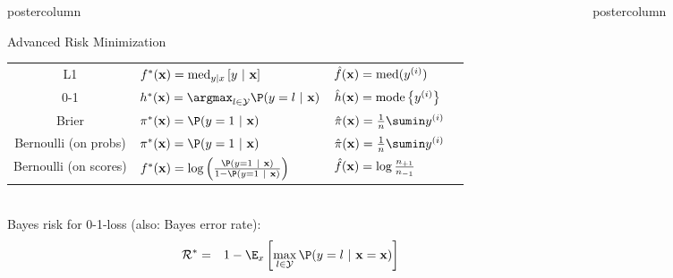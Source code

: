 \documentclass{beamer}
\newlength{\columnheight} %
\begin{document}
\begin{frame}[fragile]{}
\begin{columns}
\begin{column}{.31\textwidth}
\begin{beamercolorbox}[center]{postercolumn}
\begin{minipage}{.98\textwidth}
{\begin{myblock}{Advanced Risk Minimization}
{{\begin{table}[]
\begin{tabular}{c|lll}
												L1 & $f^{\ast}(\mathbf{x}) = \text{med}_{y|x} \left[y ~|~ \mathbf{x} \right]$ & $\hat{f}(\mathbf{x}) = \text{med}(y^{(i)})$\\
												0-1 & $\hxbayes = \argmax_{l \in \Yspace} \P(y = l~|~ \xv)$  & $\hat{h}(\mathbf{x}) = \text{mode} \left\{y^{(i)}\right\}$ \\
												Brier & $\pixbayes = \P(y = 1~|~\xv)$ & $\pixh =  \frac{1}{n} \sumin \yi$\\
												Bernoulli (on probs) & $\pixbayes = \P(y = 1~|~\xv)$ & $\pixh =  \frac{1}{n} \sumin \yi$ \\
												Bernoulli (on scores) & $\fxbayes = \log\left(\frac{\P(y = 1 ~|~\xv)}{1 - \P(y = 1 ~|~\xv)}\right)$ & $\hat{f}(\mathbf{x}) = \log \frac{n_{+1}}{n_{-1}}$  
											\end{tabular}
										\end{table}
									}
								}\\

								Bayes risk for  0-1-loss (also: Bayes error rate):
								\begin{eqnarray*}  
									\riskbayes &=& 1 - \E_x \left[\max_{l \in \Yspace} \P(y = l~|~ \xv = \xv)\right]
								\end{eqnarray*}

							\end{myblock}\vfill
						}
					\end{minipage}
				\end{beamercolorbox}
			\end{column}
			\begin{column}{.31\textwidth}
				\begin{beamercolorbox}[center]{postercolumn}
					\begin{minipage}{.98\textwidth}
						\parbox[t][\columnheight]{\textwidth}{
							\begin{myblock}{} \vspace{-4ex}


\end{myblock}}
\end{minipage}
\end{beamercolorbox}
\end{column}
\end{columns}
\end{frame}
\end{document}
